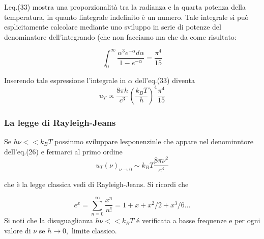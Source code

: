 \documentclass[11pt]{article}
\makeatletter
\newcommand{\boxspacing}{\kern\kvtcb@left@rule\kern\kvtcb@boxsep}
\newcommand{\prompt}[4]{
        \ttfamily\llap{{\color{#2}[#3]:\hspace{3pt}#4}}\vspace{-\baselineskip}
    }
\makeatother
\begin{document}
Leq.(33) mostra una proporzionalità tra la radianza e la quarta potenza
della temperatura, in quanto lintegrale indefinito è un numero. Tale
integrale si può esplicitamente calcolare mediante uno sviluppo in serie
di potenze del denominatore dell'integrando (che non facciamo ma che da
come risultato:

\[
\int_{0}^{\infty} \frac{\alpha^{3} e^{-\alpha} d \alpha}{1-e^{-\alpha}}= \frac{\pi^{4}}{15}\]

Inserendo tale espressione l'integrale in \(\alpha\) dell'eq.(33)
diventa \[
u_{T}  \propto \frac{8 \pi h}{c^{3}}\left(\frac{k_{B} T}{h}\right)^{4}  \frac{\pi^{4}}{15}
\]

    \hypertarget{la-legge-di-rayleigh-jeans}{%
\subsubsection{La legge di
Rayleigh-Jeans}\label{la-legge-di-rayleigh-jeans}}

Se \(h \nu<<k_{B} T\) possinmo sviluppare lesponenzinle che appare nel
denominntore dell'eq.(26) e fermarci al primo ordine \[
u_{T}(\nu)_{\nu \rightarrow 0} \sim k_{B} T \frac{8 \pi \nu^{2}}{c^{3}}
\]

che è la legge classica vedi di Rayleigh-Jeans. Si ricordi che

\[
e^{x}=\sum_{n=0}^{\infty} \frac{x^{n}}{n !}=1+x+x^{2} / 2+x^{3} / 6 \ldots
\] Si noti che la disuguaglianza \(h \nu<<k_{B} T\) é verificata a basse
frequenze e per ogni valore di \(\nu\) se \(h \rightarrow 0,\) limite
classico.

    \begin{tcolorbox}[breakable, size=fbox, boxrule=1pt, pad at break*=1mm,colback=cellbackground, colframe=cellborder]
\prompt{In}{incolor}{ }{\boxspacing}
\begin{Verbatim}[commandchars=\\\{\}]

\end{Verbatim}
\end{tcolorbox}


    
    
    
\end{document}
